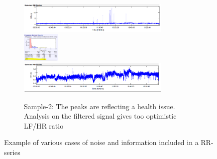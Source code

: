 \documentclass[a4paper, 11pt]{report}\usepackage[]{graphicx}\usepackage[]{color}
\numberwithin{figure}{section}
\begin{document}
\begin{appendices}
\begin{figure}[H]
\begin{subfigure}[t]{\textwidth}
\includegraphics[width = 0.8\textwidth]{figure/noiseHandling/NoiseHandling-7}
\includegraphics[width = 0.2\textwidth]{figure/noiseHandling/NoiseHandling-4}
\includegraphics[width = 0.8\textwidth]{figure/noiseHandling/NoiseHandling-8}
\caption{Sample-2: The peaks are reflecting a health issue. Analysis on the filtered signal gives too optimistic LF/HR ratio}
\label{fig:noiseHandling-s2}
\end{subfigure}
\caption{Example of various cases of noise and information included in a RR-series}
\label{fig:noiseHandling}
\end{figure}
\end{appendices}
\end{document}
